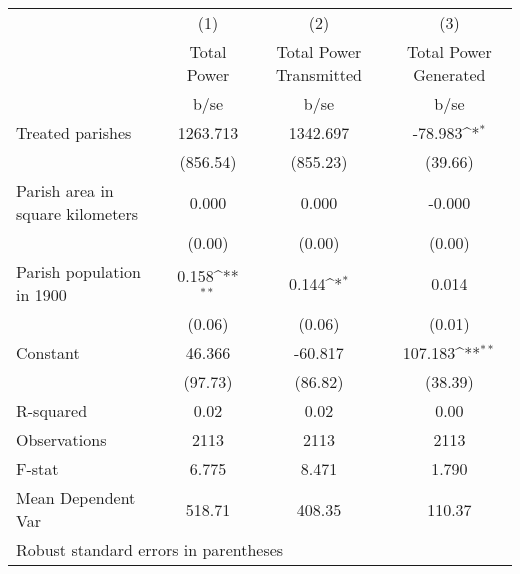 {
\def\sym#1{\ifmmode^{#1}\else\(^{#1}\)\fi}
\begin{tabular}{l*{3}{c}}
\hline\hline
                    &\multicolumn{1}{c}{(1)}         &\multicolumn{1}{c}{(2)}         &\multicolumn{1}{c}{(3)}         \\
                    & Total Power         &Total Power Transmitted         &Total Power Generated         \\
                    &        b/se         &        b/se         &        b/se         \\
\hline
Treated parishes    &    1263.713         &    1342.697         &     -78.983\sym{*}  \\
                    &    (856.54)         &    (855.23)         &     (39.66)         \\
Parish area in square kilometers&       0.000         &       0.000         &      -0.000         \\
                    &      (0.00)         &      (0.00)         &      (0.00)         \\
Parish population in 1900&       0.158\sym{**} &       0.144\sym{*}  &       0.014         \\
                    &      (0.06)         &      (0.06)         &      (0.01)         \\
Constant            &      46.366         &     -60.817         &     107.183\sym{**} \\
                    &     (97.73)         &     (86.82)         &     (38.39)         \\
\hline
R-squared           &        0.02         &        0.02         &        0.00         \\
Observations        &        2113         &        2113         &        2113         \\
F-stat              &       6.775         &       8.471         &       1.790         \\
Mean Dependent Var  &      518.71         &      408.35         &      110.37         \\
\hline\hline
\multicolumn{4}{l}{\footnotesize Robust standard errors in parentheses}\\
\end{tabular}
}
